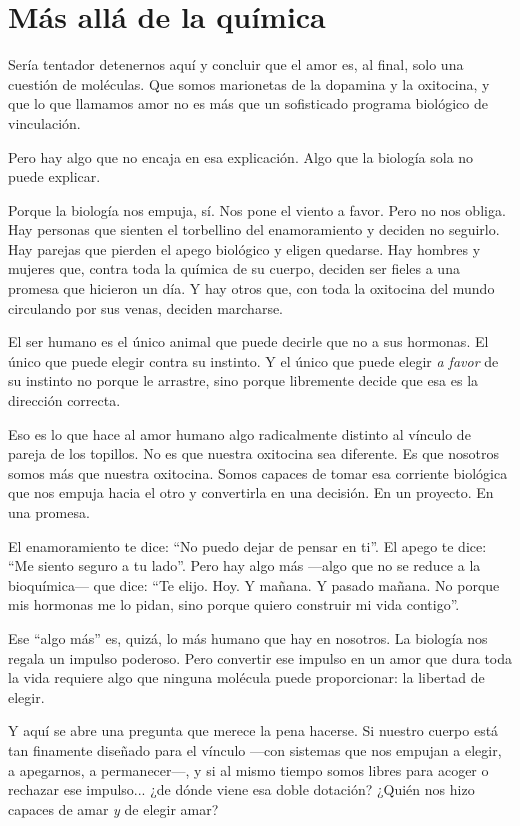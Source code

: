 \section{Más allá de la química}

Sería tentador detenernos aquí y concluir que el amor es, al final, solo una cuestión de moléculas. Que somos marionetas de la dopamina y la oxitocina, y que lo que llamamos amor no es más que un sofisticado programa biológico de vinculación.

Pero hay algo que no encaja en esa explicación. Algo que la biología sola no puede explicar.

Porque la biología nos empuja, sí. Nos pone el viento a favor. Pero no nos obliga. Hay personas que sienten el torbellino del enamoramiento y deciden no seguirlo. Hay parejas que pierden el apego biológico y eligen quedarse. Hay hombres y mujeres que, contra toda la química de su cuerpo, deciden ser fieles a una promesa que hicieron un día. Y hay otros que, con toda la oxitocina del mundo circulando por sus venas, deciden marcharse.

El ser humano es el único animal que puede decirle que no a sus hormonas. El único que puede elegir contra su instinto. Y el único que puede elegir \textit{a favor} de su instinto no porque le arrastre, sino porque libremente decide que esa es la dirección correcta.

Eso es lo que hace al amor humano algo radicalmente distinto al vínculo de pareja de los topillos. No es que nuestra oxitocina sea diferente. Es que nosotros somos más que nuestra oxitocina. Somos capaces de tomar esa corriente biológica que nos empuja hacia el otro y convertirla en una decisión. En un proyecto. En una promesa.

El enamoramiento te dice: ``No puedo dejar de pensar en ti''. El apego te dice: ``Me siento seguro a tu lado''. Pero hay algo más ---algo que no se reduce a la bioquímica--- que dice: ``Te elijo. Hoy. Y mañana. Y pasado mañana. No porque mis hormonas me lo pidan, sino porque quiero construir mi vida contigo''.

Ese ``algo más'' es, quizá, lo más humano que hay en nosotros. La biología nos regala un impulso poderoso. Pero convertir ese impulso en un amor que dura toda la vida requiere algo que ninguna molécula puede proporcionar: la libertad de elegir.

Y aquí se abre una pregunta que merece la pena hacerse. Si nuestro cuerpo está tan finamente diseñado para el vínculo ---con sistemas que nos empujan a elegir, a apegarnos, a permanecer---, y si al mismo tiempo somos libres para acoger o rechazar ese impulso... ¿de dónde viene esa doble dotación? ¿Quién nos hizo capaces de amar \textit{y} de elegir amar?

